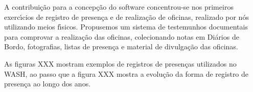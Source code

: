 \documentclass[
12pt,		%
openright,	%
twoside,  %
a4paper,			%
chapter=TITLE,		%
english,			%
french,				%
spanish,			%
brazil				%
]{USPSC-classe/USPSC}
\begin{document}
A contribui\c{c}\~ao para a concep\c{c}\~ao do software concentrou-se nos primeiros exerc\'{\i}cios de registro de presen\c{c}a e de realiza\c{c}\~ao de oficinas, realizado por n\'os utilizando meios f\'{\i}sicos. Propusemos um sistema de testemunhos documentais para comprovar a realiza\c{c}\~ao das oficinas, colecionando notas em Di\'arios de Bordo, fotografias, listas de presen\c{c}a e material de divulga\c{c}\~ao das oficinas.

















As figuras XXX mostram exemplos de registros de presen\c{c}as utilizados no WASH, ao passo que a figura XXX mostra a evolu\c{c}\~ao da forma de registro de presen\c{c}a ao longo dos anos.
\end{document}
